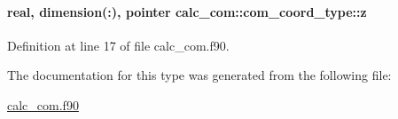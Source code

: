 \hypertarget{structcalc__com_1_1com__coord__type_a94700d8339fec547c9b5156f5439ca88}{
\paragraph[{z}]{\setlength{\rightskip}{0pt plus 5cm}real, dimension(\-:), pointer calc\-\_\-com\-::com\-\_\-coord\-\_\-type\-::z}}\label{structcalc__com_1_1com__coord__type_a94700d8339fec547c9b5156f5439ca88}


Definition at line 17 of file calc\-\_\-com.\-f90.



The documentation for this type was generated from the following file\-:\begin{DoxyCompactItemize}
\item 
\hyperlink{calc__com_8f90}{calc\-\_\-com.\-f90}\end{DoxyCompactItemize}

